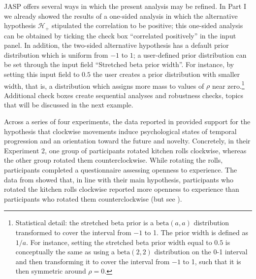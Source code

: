 JASP offers several ways in which the present analysis may be refined. In Part I we already showed the results of a one-sided analysis in which the alternative hypothesis $\mathcal{H}_+$ stipulated the correlation to be positive; this one-sided analysis can be obtained by ticking the check box ``correlated positively'' in the input panel. In addition, the two-sided alternative hypothesis has a default prior distribution which is uniform from $-1$ to $1$; a user-defined prior distribution can be set through the input field ``Stretched beta prior width''. For instance, by setting this input field to $0.5$ the user creates a prior distribution with smaller width, that is, a distribution which assigns more mass to values of $\rho$ near zero.\footnote{Statistical detail: the stretched beta prior is a $\text{beta}(a,a)$ distribution transformed to cover the interval from $-1$ to 1. The prior width is defined as $1/a$. For instance, setting the stretched beta prior width equal to $0.5$ is conceptually the same as using a $\text{beta}(2,2)$ distribution on the 0-1 interval and then transforming it to cover the interval from $-1$ to 1, such that it is then symmetric around $\rho=0$.} Additional check boxes create sequential analyses and robustness checks, topics that will be discussed in the next example.

Across a series of four experiments, the data reported in  provided support for the hypothesis that clockwise movements induce psychological states of temporal progression and an orientation toward the future and novelty. Concretely, in their Experiment 2, one group of participants rotated kitchen rolls clockwise, whereas the other group rotated them counterclockwise. While rotating the rolls, participants completed a questionnaire assessing openness to experience. The data from  showed that, in line with their main hypothesis, participants who rotated the kitchen rolls clockwise reported more openness to experience than participants who rotated them counterclockwise (but see ).

